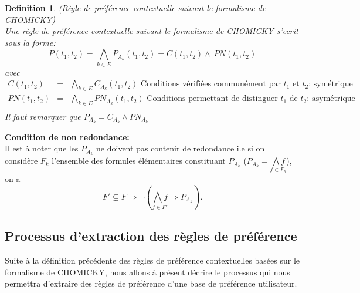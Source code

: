 \documentclass[a4paper,12pt,openany,oneside]{article}
\newtheorem{defn}{Definition} %
\begin{document}
 	\begin{defn}(Règle de préférence contextuelle suivant le formalisme de CHOMICKY)\\
 	Une règle de préférence contextuelle suivant le formalisme de CHOMICKY s'ecrit sous la forme:
 	\[
 		P(t_{1},t_{2})=\underset{k\in E}{\bigwedge} P_{A_{k}}(t_{1},t_{2})=C(t_{1},t_{2})\wedge\ PN(t_{1},t_{2})
 	\]
 	avec
 	\[
 	\begin{array}{rcl}
 			C(t_{1},t_{2})&=&\underset{k\in E}{\bigwedge} C_{A_{k}}(t_{1},t_{2}) \text{ Conditions vérifiées communément par $t_1$ et $t_2$: symétrique}\\
 			PN(t_{1},t_{2})&=&\underset{k\in E}{\bigwedge} PN_{A_{k}}(t_{1},t_{2})\text{ Conditions permettant de distinguer $t_1$ de $t_2$: asymétrique}\\
 	\end{array}
 	\]
 	Il faut remarquer que $P_{A_{k}}= C_{A_{k}}\wedge PN_{A_{k}}$
 	\end{defn}
 			    
 
 
       	\textbf{Condition de non redondance:}\\
       	Il est à noter que les $P_{A_{k}}$ ne doivent pas contenir de redondance i.e si on considère $F_{k}$ l'ensemble des formules élémentaires constituant $P_{A_{k}}$ ($P_{A_{k}}=\underset{f\in F_{k}}{\bigwedge f}$), on a 
       	\[
       	 F'\subsetneq F\Rightarrow \neg (\underset{f\in F'}{\bigwedge f}\Rightarrow P_{A_{k}}).
       	\]
       	
       
        
     \subsection{Processus d'extraction des règles de préférence}
     Suite à la définition précédente des règles de préférence contextuelles basées sur le formalisme de CHOMICKY, nous allons à présent décrire le processus qui nous permettra d'extraire des règles de préférence d'une base de préférence utilisateur. \\
     
\end{document}
